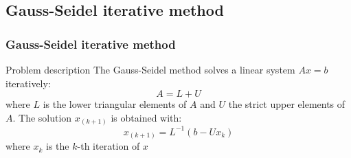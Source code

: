 \subsection{Gauss-Seidel iterative method}
\begin{frame}[containsverbatim]
\frametitle{Gauss-Seidel iterative method}
\begin{block}{Problem description}
The Gauss-Seidel method solves a linear system $Ax = b$ iteratively:
$$
A = L + U
$$
where $L$ is the lower triangular elements of $A$ and $U$ the strict upper elements of $A$. The solution $x_{(k+1)}$ is obtained with:
$$
x_{(k+1)} = L^{-1} ( b - U x_k)
$$
where $x_k$ is the $k$-th iteration of $x$
\end{block}
\end{frame}







